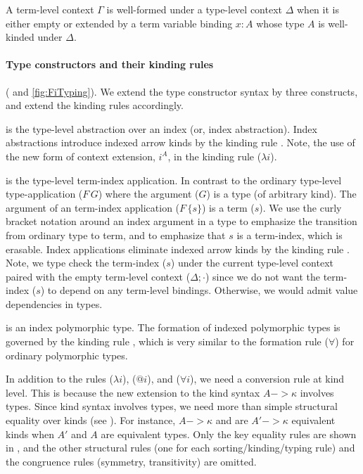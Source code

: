 A term-level context $\Gamma$ is well-formed under a type-level context
$\Delta$ when it is either empty or extended by a term variable binding
$x:A$ whose type $A$ is well-kinded under $\Delta$.

\paragraph{Type constructors and their kinding rules\!}( and \ref{fig:FiTyping}).\;
We extend the type constructor syntax by three constructs,
and extend the kinding rules accordingly.

 is the type-level abstraction over an index
(or, index abstraction). Index abstractions introduce indexed arrow kinds
by the kinding rule . Note, the use of the new form of
context extension, $i^A$, in the kinding rule ($\lambda i$).

 is the type-level term-index application. In contrast to
the ordinary type-level type-application ($F\,G$) where the argument ($G$) is
a type (of arbitrary kind). The argument of an term-index application ($F\,\{s\}$) is
a term ($s$). We use the curly bracket notation around an index argument
in a type to emphasize the transition from ordinary type to term, and
to emphasize that $s$ is a term-index, which is erasable. Index applications
eliminate indexed arrow kinds by the kinding rule .
Note, we type check
the term-index ($s$) under the current type-level context paired with
the empty term-level context ($\Delta;\cdot$) since we do not want
the term-index ($s$) to depend on any term-level bindings.
Otherwise, we would admit value dependencies in types.

 is an index polymorphic type.
The formation of indexed polymorphic types is governed by
the kinding rule , which is very similar to
the formation rule ($\forall$) for ordinary polymorphic types.

In addition to the rules ($\lambda i$), ($@ i$), and ($\forall i$),
we need a conversion rule  at kind level. This is because
the new extension to the kind syntax $A -> \kappa$ involves types.
Since kind syntax involves types, we need more than simple structural
equality over kinds (see ). For instance, $A -> \kappa$ and 
are $A' -> \kappa$ equivalent kinds when $A'$ and $A$ are equivalent types.
Only the key equality rules are shown in , and the other
structural rules (one for each sorting/kinding/typing rule) and
the congruence rules (symmetry, transitivity) are omitted.

